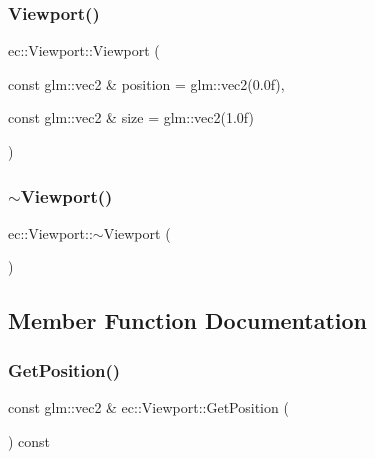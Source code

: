 \subsubsection{\texorpdfstring{Viewport()}{Viewport()}}
{\footnotesize\ttfamily ec\+::\+Viewport\+::\+Viewport (\begin{DoxyParamCaption}\item[{const glm\+::vec2 \&}]{position = {\ttfamily glm\+:\+:vec2(0.0f)},  }\item[{const glm\+::vec2 \&}]{size = {\ttfamily glm\+:\+:vec2(1.0f)} }\end{DoxyParamCaption})\hspace{0.3cm}{\ttfamily [explicit]}}

\mbox{\label{classec_1_1_viewport_a65341c63372c6158a0a2932fa1f2c66b}} 
\subsubsection{\texorpdfstring{$\sim$\+Viewport()}{~Viewport()}}
{\footnotesize\ttfamily ec\+::\+Viewport\+::$\sim$\+Viewport (\begin{DoxyParamCaption}{ }\end{DoxyParamCaption})}



\subsection{Member Function Documentation}
\mbox{\label{classec_1_1_viewport_aee8a504b5b66702a627cc13aa3e4ac94}} 
\subsubsection{\texorpdfstring{Get\+Position()}{GetPosition()}}
{\footnotesize\ttfamily const glm\+::vec2 \& ec\+::\+Viewport\+::\+Get\+Position (\begin{DoxyParamCaption}{ }\end{DoxyParamCaption}) const}

\mbox{\label{classec_1_1_viewport_a128183b59733fcef73d52a9f61f82181}} 
